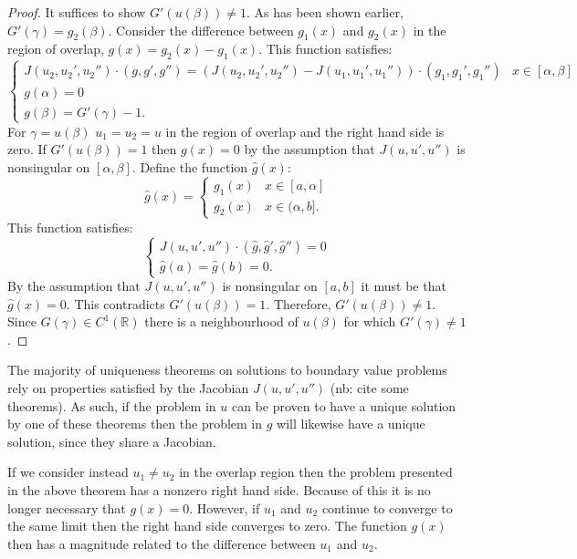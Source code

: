 \documentclass{book}
\begin{document}
\begin{proof}
It suffices to show $G'(u(\beta)) \neq 1$.
As has been shown earlier, $G'(\gamma) = g_2(\beta)$.
Consider the difference between $g_1(x)$ and $g_2(x)$ in the region of overlap, $g(x) = g_2(x) - g_1(x)$.
This function satisfies:
\begin{equation*}
\begin{cases} J(u_2,u_2',u_2'') \cdot (g, g', g'') = \left ( J(u_2, u_2', u_2'') - J(u_1, u_1', u_1'') \right ) \cdot (g_1, g_1', g_1'') & x \in [\alpha, \beta] \\ g(\alpha) = 0 \\ g(\beta) = G'(\gamma) - 1. \end{cases}
\end{equation*}
For $\gamma = u(\beta)$ $u_1 = u_2 = u$ in the region of overlap and the right hand side is zero.
If $G'(u(\beta)) = 1$ then $g(x) = 0$ by the assumption that $J(u,u',u'')$ is nonsingular on $[\alpha,\beta]$.
Define the function $\hat{g}(x)$:
\begin{equation*}
\hat{g}(x) = \begin{cases} g_1(x) & x \in [a,\alpha] \\ g_2(x) & x \in (\alpha,b]. \end{cases}
\end{equation*}
This function satisfies:
\begin{equation*}
\begin{cases} J(u,u',u'') \cdot (\hat{g},\hat{g}',\hat{g}'') = 0 \\ \hat{g}(a) = \hat{g}(b) = 0. \end{cases}
\end{equation*}
By the assumption that $J(u,u',u'')$ is nonsingular on $[a,b]$ it must be that $\hat{g}(x) = 0$.
This contradicts $G'(u(\beta)) = 1$.
Therefore, $G'(u(\beta)) \neq 1$.
Since $G(\gamma) \in C^1(\mathbb{R})$ there is a neighbourhood of $u(\beta)$ for which $G'(\gamma) \neq 1$.
\end{proof}

The majority of uniqueness theorems on solutions to boundary value problems rely on properties satisfied by the Jacobian $J(u,u',u'')$ (nb: cite some theorems).
As such, if the problem in $u$ can be proven to have a unique solution by one of these theorems then the problem in $g$ will likewise have a unique solution, since they share a Jacobian.

If we consider instead $u_1 \neq u_2$ in the overlap region then the problem presented in the above theorem has a nonzero right hand side.
Because of this it is no longer necessary that $g(x) = 0$.
However, if $u_1$ and $u_2$ continue to converge to the same limit then the right hand side converges to zero.
The function $g(x)$ then has a magnitude related to the difference between $u_1$ and $u_2$.
\end{document}
